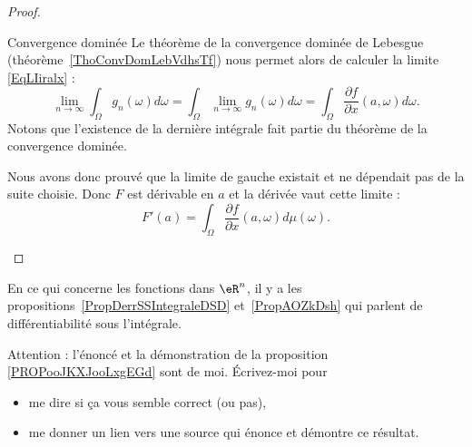 \begin{proof}
\begin{subproof}
		\item[Convergence dominée]
		Le théorème de la convergence dominée de Lebesgue (théorème~\ref{ThoConvDomLebVdhsTf}) nous permet alors de calculer la limite \eqref{EqLIiralx} :
		\begin{equation}
			\lim_{n\to \infty} \int_{\Omega}g_n(\omega)d\omega=\int_{\Omega}\lim_{n\to \infty} g_n(\omega)d\omega=\int_{\Omega}\frac{ \partial f }{ \partial x }(a,\omega)d\omega.
		\end{equation}
		Notons que l'existence de la dernière intégrale fait partie du théorème de la convergence dominée.

		Nous avons donc prouvé que la limite de gauche existait et ne dépendait pas de la suite choisie. Donc \( F\) est dérivable en \( a\) et la dérivée vaut cette limite :
		\begin{equation}
			F'(a)=\int_{\Omega}\frac{ \partial f }{ \partial x }(a,\omega)d\mu(\omega).
		\end{equation}
	\end{subproof}
\end{proof}

En ce qui concerne les fonctions dans \( \eR^n\), il y a les  propositions~\ref{PropDerrSSIntegraleDSD} et~\ref{PropAOZkDsh} qui parlent de différentiabilité sous l'intégrale.

\begin{probleme}
	Attention : l'énoncé et la démonstration de la proposition \ref{PROPooJKXJooLxgEGd} sont de moi. Écrivez-moi pour
	\begin{itemize}
		\item me dire si ça vous semble correct (ou pas),
		\item me donner un lien vers une source qui énonce et démontre ce résultat.
	\end{itemize}
\end{probleme}


